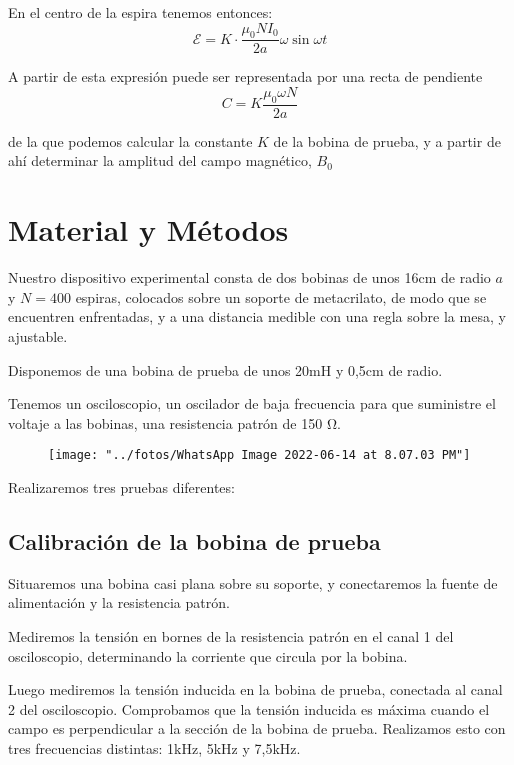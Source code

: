 \documentclass[a4paper,12pt,spanish]{article}
\begin{document}
En el centro de la espira tenemos entonces:
\[ \mathcal{E} = K \cdot \frac{\mu_0 N I_0}{2a} \omega \sin \omega t\]

A partir de esta expresión puede ser representada por una recta de pendiente
\[C= K \frac{\mu_0 \omega N}{2 a }\]

de la que podemos calcular la constante $K$ de la bobina de prueba, y a partir de ahí determinar la amplitud del campo magnético, $B_0$


\section{Material y Métodos}


Nuestro dispositivo experimental consta de dos bobinas de unos 16cm de radio $a$ y $N = 400$ espiras, colocados sobre un soporte de metacrilato, de modo que se encuentren enfrentadas, y a una distancia medible con una regla sobre la mesa, y ajustable.

Disponemos de una bobina de prueba de unos 20mH y 0,5cm de radio.

Tenemos un osciloscopio, un oscilador de baja frecuencia para que suministre el voltaje a las bobinas, una resistencia patrón de 150 $\si{\ohm}$.


\begin{figure}[H]
	\centering
	\texttt{[image: "../fotos/WhatsApp Image 2022-06-14 at 8.07.03 PM"]}
	\caption{}
	\label{fig:whatsapp-image-2022-06-14-at-8}
\end{figure}

Realizaremos tres pruebas diferentes:

\subsection{Calibración de la bobina de prueba}

Situaremos una bobina casi plana sobre su soporte, y conectaremos la fuente de alimentación y la resistencia patrón.

Mediremos la tensión en bornes de la resistencia patrón en el canal 1 del osciloscopio, determinando la corriente que circula por la bobina.

Luego mediremos la tensión inducida en la bobina de prueba, conectada al canal 2 del osciloscopio. Comprobamos que la tensión inducida es máxima cuando el campo es perpendicular a la sección de la bobina de prueba. Realizamos esto con tres frecuencias distintas: 1kHz, 5kHz y 7,5kHz.
\end{document}
